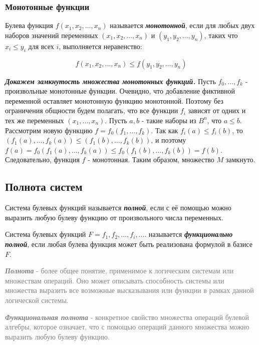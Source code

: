 \documentclass[12pt,letterpaper]{article}
\begin{document}
\subsubsection{Монотонные функции}

Булева функция \(f(x_1, x_2, \ldots, x_n)\) называется \textbf{\emph{монотонной}}, если для любых двух наборов значений переменных \((x_1, x_2, \ldots, x_n)\) и \((y_1, y_2, \ldots, y_n)\), таких что \(x_i \leq y_i\) для всех \(i\), выполняется неравенство:

\[f(x_1, x_2, \ldots, x_n) \leq f(y_1, y_2, \ldots, y_n)\]

\textbf{\emph{Докажем замкнутость множества монотонных функций.}} Пусть \(f_0, \ldots, f_k\) - произвольные монотонные функции. Очевидно, что добавление фиктивной переменной оставляет монотонную функцию монотонной. Поэтому без ограничения общности будем полагать, что все функции \(f_i\) зависят от одних и тех же переменных \((x_1, \ldots, x_n)\). Пусть \(a, b\) - такие наборы из \(B^n\), что \(a \leq b\). Рассмотрим новую функцию \(f = f_0(f_1, \ldots, f_k)\). Так как \(f_i(a) \leq f_i(b)\), то \((f_1(a), \ldots, f_k(a)) \leq (f_1(b), \ldots, f_k(b))\), и поэтому \(f(a) = f_0(f_1(a), \ldots, f_k(a)) \leq f_0(f_1(b), \ldots, f_k(b)) = f(b)\). Следовательно, функция \(f\) - монотонная. Таким образом, множество \(M\) замкнуто.

\subsection{Полнота систем}

Система булевых функций называется \textbf{\emph{полной}}, если с её помощью можно выразить любую булеву функцию от произвольного числа переменных.

Система булевых функций \(F = f_1, f_2, \ldots, f_i, \ldots\). называется \textbf{\emph{функционально полной}}, если любая булева функция может быть реализована формулой в базисе \(F\).

\textcolor{gray}{\textbf{\emph{Полнота}} - более общее понятие, применимое к логическим системам или множествам операций. Оно может описывать способность системы или множества выразить все возможные высказывания или функции в рамках данной логической системы.}

\textcolor{gray}{\textbf{\emph{Функциональная полнота}} - конкретное свойство множества операций булевой алгебры, которое означает, что с помощью операций данного множества можно выразить любую булеву функцию.}
\end{document}
